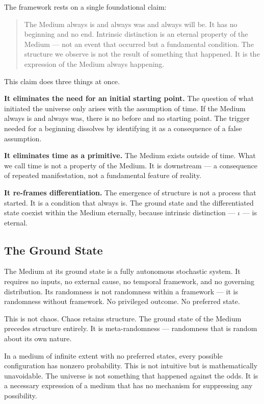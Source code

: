 \documentclass[11pt,letterpaper]{article}
\begin{document}
The framework rests on a single foundational claim:

\begin{quote}
The Medium always is and always was and always will be. It has no beginning and no end. Intrinsic distinction is an eternal property of the Medium --- not an event that occurred but a fundamental condition. The structure we observe is not the result of something that happened. It is the expression of the Medium always happening.
\end{quote}

This claim does three things at once.

\textbf{It eliminates the need for an initial starting point.} The question of what initiated the universe only arises with the assumption of time. If the Medium always is and always was, there is no before and no starting point. The trigger needed for a beginning dissolves by identifying it as a consequence of a false assumption.

\textbf{It eliminates time as a primitive.} The Medium exists outside of time. What we call time is not a property of the Medium. It is downstream --- a consequence of repeated manifestation, not a fundamental feature of reality.

\textbf{It re-frames differentiation.} The emergence of structure is not a process that started. It is a condition that always is. The ground state and the differentiated state coexist within the Medium eternally, because intrinsic distinction --- \(\iota\) --- is eternal.

\subsection{The Ground State}
\label{sec:org680acc3}

The Medium at its ground state is a fully autonomous stochastic system. It requires no inputs, no external cause, no temporal framework, and no governing distribution. Its randomness is not randomness within a framework --- it is randomness without framework. No privileged outcome. No preferred state.

This is not chaos. Chaos retains structure. The ground state of the Medium precedes structure entirely. It is meta-randomness --- randomness that is random about its own nature.

In a medium of infinite extent with no preferred states, every possible configuration has nonzero probability. This is not intuitive but is mathematically unavoidable. The universe is not something that happened against the odds. It is a necessary expression of a medium that has no mechanism for suppressing any possibility.
\end{document}

